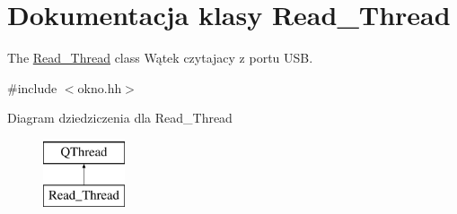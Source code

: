 \hypertarget{class_read___thread}{\section{Dokumentacja klasy Read\-\_\-\-Thread}
\label{class_read___thread}
}


The \hyperlink{class_read___thread}{Read\-\_\-\-Thread} class Wątek czytajacy z portu U\-S\-B.  




{\ttfamily \#include $<$okno.\-hh$>$}

Diagram dziedziczenia dla Read\-\_\-\-Thread\begin{figure}[H]
\begin{center}
\leavevmode
\includegraphics[height=2.000000cm]{class_read___thread}
\end{center}
\end{figure}
